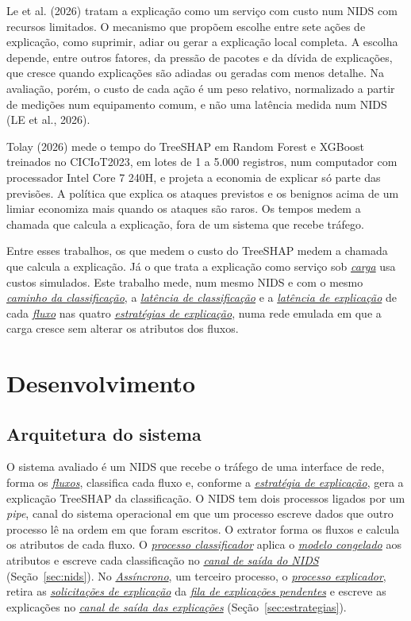 \documentclass[
  12pt,
  oneside,
  a4paper,
  chapter=TITLE,
  sumario=tradicional,
  english,
  brazil
]{abntex2}
\newcommand{\termo}[2]{\hyperref[gl:#1]{\emph{#2}}}
\begin{document}
Le et al. (2026) tratam a explicação como um serviço com custo num NIDS com recursos limitados. O
mecanismo que propõem escolhe entre sete ações de explicação, como suprimir, adiar ou gerar a
explicação local completa. A escolha depende, entre outros fatores, da pressão de pacotes e da
dívida de explicações, que cresce quando explicações são adiadas ou geradas com menos detalhe. Na
avaliação, porém, o custo de cada ação é um peso relativo, normalizado a partir de medições num
equipamento comum, e não uma latência medida num NIDS (LE et al., 2026).

Tolay (2026) mede o tempo do TreeSHAP em Random Forest e XGBoost treinados no CICIoT2023, em lotes
de 1 a 5.000 registros, num computador com processador Intel Core 7 240H, e projeta a economia de
explicar só parte das previsões. A política que explica os ataques previstos e os benignos acima de
um limiar economiza mais quando os ataques são raros. Os tempos medem a chamada que calcula a explicação, fora
de um sistema que recebe tráfego.

Entre esses trabalhos, os que medem o custo do TreeSHAP medem a chamada que calcula a explicação. Já o que
trata a explicação como serviço sob \termo{carga}{carga} usa custos simulados. Este trabalho mede,
num mesmo NIDS e com o mesmo \termo{caminho}{caminho da classificação}, a
\termo{latencia-classificacao}{latência de classificação} e a
\termo{latencia-explicacao}{latência de explicação} de cada \termo{fluxo}{fluxo} nas quatro
\termo{estrategia}{estratégias de explicação}, numa rede emulada em que a carga cresce sem alterar
os atributos dos fluxos.

\chapter{Desenvolvimento}
\label{cap:metodologia}

\section{Arquitetura do sistema}
\label{sec:arquitetura}

O sistema avaliado é um NIDS que recebe o tráfego de uma interface de rede, forma os
\termo{fluxo}{fluxos}, classifica cada fluxo e, conforme a \termo{estrategia}{estratégia de
explicação}, gera a explicação TreeSHAP da classificação. O NIDS tem dois processos ligados por um
\emph{pipe}, canal do sistema operacional em que um processo escreve dados que outro processo lê na
ordem em que foram escritos. O extrator forma os fluxos e calcula os atributos de cada fluxo. O
\termo{processo-classificador}{processo classificador} aplica o \termo{modelo-congelado}{modelo
congelado} aos atributos e escreve cada classificação no \termo{canal-nids}{canal de saída do NIDS}
(Seção~\ref{sec:nids}). No \termo{assincrono}{Assíncrono}, um terceiro processo, o
\termo{processo-explicador}{processo explicador}, retira as \termo{solicitacao}{solicitações de
explicação} da \termo{fila-explicacoes}{fila de explicações pendentes} e escreve as explicações no
\termo{canal-explicacoes}{canal de saída das explicações} (Seção~\ref{sec:estrategias}).
\end{document}
